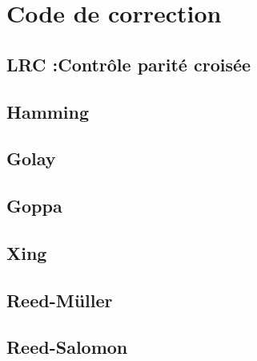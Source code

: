 
\part{Code de correction}


    \chapter{LRC :Contrôle parité croisée}



    \chapter{Hamming}



    \chapter{Golay}



    \chapter{Goppa}



    \chapter{Xing}



    \chapter{Reed-Müller}



    \chapter{Reed-Salomon}


